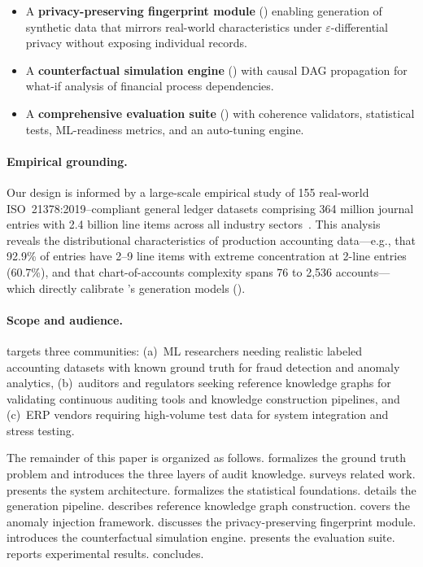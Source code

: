 \begin{itemize}
  \item A \textbf{privacy-preserving fingerprint module}
    () enabling generation of synthetic data that
    mirrors real-world characteristics under $\varepsilon$-differential
    privacy without exposing individual records.

  \item A \textbf{counterfactual simulation engine}
    () with causal DAG propagation for what-if
    analysis of financial process dependencies.

  \item A \textbf{comprehensive evaluation suite}
    () with coherence validators, statistical
    tests, ML-readiness metrics, and an auto-tuning engine.
\end{itemize}

\paragraph{Empirical grounding.}
Our design is informed by a large-scale empirical study of 155 real-world
ISO~21378:2019--compliant general ledger datasets comprising 364 million
journal entries with 2.4 billion line items across all industry
sectors~\citep{ivertowski2024hardware}.  This analysis reveals the
distributional characteristics of production accounting data---e.g., that
92.9\% of entries have 2--9 line items with extreme concentration at
2-line entries (60.7\%), and that chart-of-accounts complexity spans 76
to 2{,}536 accounts---which directly calibrate \system{}'s generation
models ().

\paragraph{Scope and audience.}
\system{} targets three communities: (a)~ML researchers needing realistic
labeled accounting datasets with known ground truth for fraud detection
and anomaly analytics, (b)~auditors and regulators seeking reference
knowledge graphs for validating continuous auditing tools and knowledge
construction pipelines, and (c)~ERP vendors requiring high-volume test
data for system integration and stress testing.

The remainder of this paper is organized as follows.
 formalizes the ground truth problem and
introduces the three layers of audit knowledge.
 surveys related work.
 presents the system architecture.
 formalizes the statistical
foundations.
 details the generation pipeline.
 describes reference knowledge graph
construction.
 covers the anomaly injection framework.
 discusses the privacy-preserving fingerprint module.
 introduces the counterfactual simulation
engine.
 presents the evaluation suite.
 reports experimental results.
 concludes.
